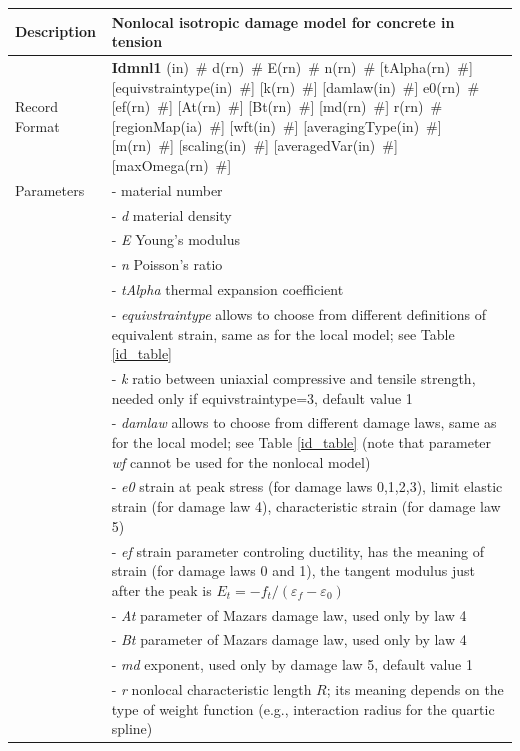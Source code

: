 \documentclass[a4paper]{article}
\newcommand{\descitem}[1]{{\noindent \bf #1}}
\newcommand{\elemparam}[2]{{{#1\tiny (#2)}~\#}}
\newcommand{\param}[1]{{\it #1}}
\begin{document}
\begin{table}[!htb]
\begin{tabular}{|l|p{9cm}|}
\hline
Description & Nonlocal isotropic damage model for concrete in tension\\
\hline
Record Format & \descitem{Idmnl1} 
\elemparam{}{in} 
\elemparam{d}{rn} 
\elemparam{E}{rn}
\elemparam{n}{rn}  
[\elemparam{tAlpha}{rn}]
[\elemparam{equivstraintype}{in}] 
[\elemparam{k}{rn}] 
[\elemparam{damlaw}{in}] 
\elemparam{e0}{rn}
[\elemparam{ef}{rn}] 
[\elemparam{At}{rn}] 
[\elemparam{Bt}{rn}] 
[\elemparam{md}{rn}] 
\elemparam{r}{rn}
[\elemparam{regionMap}{ia}]
[\elemparam{wft}{in}]
[\elemparam{averagingType}{in}]
[\elemparam{m}{rn}]
[\elemparam{scaling}{in}]
[\elemparam{averagedVar}{in}]
[\elemparam{maxOmega}{rn}]\\
Parameters &- \param{} material number\\
&- \param{d} material density\\
&- \param{E} Young's modulus\\
&- \param{n} Poisson's ratio\\
&- \param{tAlpha} thermal expansion coefficient\\
&- \param{equivstraintype} allows to choose from different definitions
of equivalent strain, same as for the local model; see Table \ref{id_table}\\
&- \param{k} ratio between uniaxial compressive and tensile strength, needed only if equivstraintype=3, default value 1\\
&- \param{damlaw} allows to choose from different damage laws, 
same as for the local model; see Table \ref{id_table}
(note that parameter {\it wf} cannot be used for the nonlocal model)\\
&- \param{e0} strain at peak stress (for damage laws 0,1,2,3), limit elastic strain (for damage law 4), characteristic strain (for damage law 5)\\
&- \param{ef} strain parameter controling ductility, has the meaning of strain (for damage laws 0 and 1), the tangent modulus just after the peak is
$E_t=-f_t/(\varepsilon_f-\varepsilon_0)$\\
&- \param{At} parameter of Mazars damage law, used only by law 4\\
&- \param{Bt} parameter of Mazars damage law, used only by law 4\\
&- \param{md} exponent, used only by damage law 5, default value 1\\
&- \param{r} nonlocal characteristic length $R$; its meaning depends
on the type of weight function (e.g., interaction radius for the quartic spline)\\

\end{tabular}
\end{table}
\end{document}
